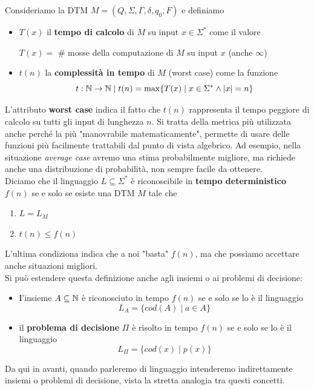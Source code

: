 Consideriamo la DTM $M = (Q, \Sigma, \Gamma, \delta, q_0, F)$ e definiamo
\begin{itemize}
	\item $T(x)$ il \textbf{tempo di calcolo} di $M$ su input $x \in \Sigma^\ast$ come il valore
	\begin{center}
		$T(x) = $ \# mosse della computazione di $M$ su input $x$ (anche $\infty$)
	\end{center}
	\item $t(n)$ la \textbf{complessità in tempo} di $M$ (worst case) come la funzione
	$$ t: \mathbb{N} \rightarrow \mathbb{N} \mid t(n) = \max \{T(x) \mid x \in \Sigma^\ast \wedge |x| = n \} $$
\end{itemize}

L'attributo \textbf{worst case} indica il fatto che $t(n)$ rappresenta il tempo peggiore di calcolo su tutti gli input di lunghezza $n$. Si tratta della metrica più utilizzata anche perché la più "manovrabile matematicamente", permette di usare delle funzioni più facilmente trattabili dal punto di vista algebrico. Ad esempio, nella situazione \textit{average case} avremo una stima probabilmente migliore, ma richiede anche una distribuzione di probabilità, non sempre facile da ottenere.\\

Diciamo che il linguaggio $L \subseteq \Sigma^\ast$ è riconoscibile in \textbf{tempo deterministico} $f(n)$ se e solo se esiste una DTM $M$ tale che
\begin{enumerate}
	\item $L= L_M$
	\item $t(n) \leq f(n)$
\end{enumerate}

L'ultima condiziona indica che a noi "basta" $f(n)$, ma che possiamo accettare anche situazioni migliori.\\

Si può estendere questa definizione anche agli insiemi o ai problemi di decisione:
\begin{itemize}
	\item \textbf l'{insieme} $A \subseteq \mathbb{N}$ è riconosciuto in tempo $f(n)$ se e solo se lo è il linguaggio
	$$ L_A = \{cod (A) \mid a \in A \} $$
	\item il \textbf{problema di decisione} $\Pi$ è risolto in tempo $f(n)$ se e solo se lo è il linguaggio 
	$$ L_\Pi = \{cod(x) \mid p(x) \} $$
\end{itemize}

Da qui in avanti, quando parleremo di linguaggio intenderemo indirettamente insiemi o problemi di decisione, vista la stretta analogia tra questi concetti.\\

